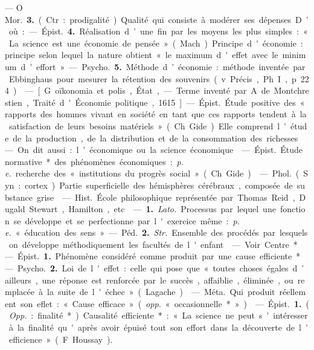 \begin{itemize}[leftmargin=1cm, label=, itemsep=1pt]
— O \si{Mor.} {\bf 3.} (Ctr. : prodigalité).
Qualité qui consiste à modérer ses
dépenses. D’où : — \si{Épist.} {\bf 4.} Réalisation d’une fin par les moyens les
plus simples : « La science est une
économie de pensée » (Mach). Principe
d'économie : principe selon
lequel la nature obtient « le maximum d'effet avec le minimum d’effort ». — \si{Psycho.} {\bf 5.} Méthode d’économie: méthode inventée par Ebbinghaus pour mesurer la rétention des
souvenirs (v. Précis, Ph. I, p. 224).

 — [G. oïkonomia et
polis, État, — Terme inventé par
A. de Montchrestien, Traité d'Économie politique, 1615] — \si{Épist.}
Étude positive des « rapports des
hommes vivant en société en tant
que ces rapports tendent à la satisfaction de leurs besoins matériels »
(Ch. Gide). Elle comprend l'étude de
la production, de la distribution et
de la consommation des richesses. —
On dit aussi : l’économique ou la
science économique.

 — \si{Épist.} Étude
normative* des phénomènes économiques : {\it p. e.} recherche des « institutions du progrès social » (Ch. Gide).

 — \si{Phol.} (Syn. : cortex). Partie
superficielle des hémisphères cérébraux, composée de substance grise.

 — \si{Hist.} École
philosophique représentée par Thomas Reid, Dugald Stewart, Hamilton, etc.

 — {\bf 1.} {\it Lato.} Processus par
lequel une fonction se développe et
se perfectionne par l'exercice même :
{\it p. e.} « éducation des sens ».

— \si{Péd.} {\bf 2.} {\it Str.} Ensemble des
procédés par lesquels on développe
méthodiquement les facultés de
l'enfant.

 — Voir Centre*.

 — \si{Épist.} {\bf 1.} Phénomène considéré comme produit par une cause
efficiente*. — \si{Psycho.} {\bf 2.} Loi de
l'effet : celle qui pose que « toutes
choses égales d’ailleurs, une réponse
est renforcée par le succès, affaiblie,
éliminée, ou remplacée à la suite de
l'échec » (Lagache).

 — \si{Méta.} Qui produit réellement son eflet : « Cause efficace »
({\it opp.} « occasionnelle* »).

 — \si{Épist.} {\bf 1.} ({\it Opp.} : finalité*). Causalité efficiente* : « La
science ne peut s'intéresser à la finalité qu'après avoir épuisé tout son
effort dans la découverte de l’efficience » (F. Houssay).


\end{itemize}

